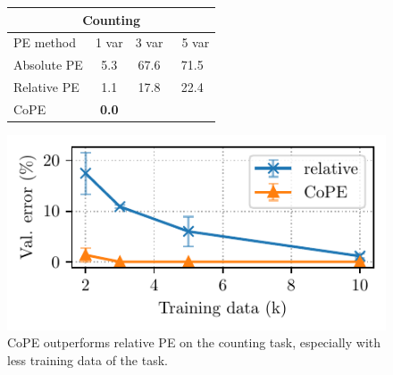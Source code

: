 \documentclass{article}
\newcommand{\ours}{CoPE\xspace}
\newcommand{\std}[1]{\small (#1)}
\begin{document}
\begin{figure}[t]
\begin{minipage}{0.44\linewidth}
  \label{tab:count}
  \centering
  \begin{tabular}{lccc}
  \multicolumn{4}{c}{Counting}\\
    \toprule
         PE method   &  1 var &  3 var & \ 5 var  \\
    \midrule
    Absolute PE & 5.3  & 67.6 & 71.5 \\
    Relative PE  & 1.1 & 17.8 & 22.4 \\
    \ours & {\bf 0.0} & \phantom{0}{\bf 1.2} & \phantom{0}{\bf 7.4}\\
    \bottomrule
  \end{tabular}
\end{minipage}\hfill
\begin{minipage}{0.54\linewidth}
  \centering
  \includegraphics[scale=0.85]{figs/count_train_size.pdf}
  \vspace{-3mm}
  \caption{\ours{} outperforms relative PE on the counting task, especially with less  training data of the task.}
  \label{fig:count}
\end{minipage}\hfill
\end{figure}
\end{document}
